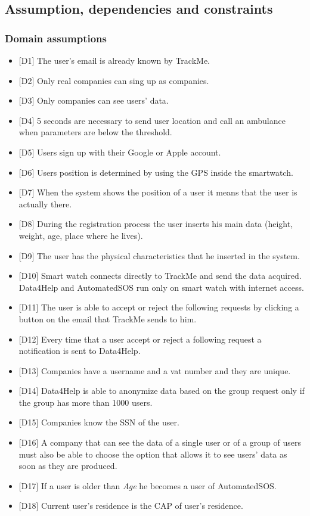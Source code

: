 \documentclass{article}
\begin{document}
\subsection{Assumption, dependencies and constraints}
\subsubsection{Domain assumptions}
\begin{itemize}
	\item {[D1]} The user's email is already known by TrackMe.
	\item {[D2]} Only real companies can sing up as companies.
	\item {[D3]} Only companies can see users' data.
	\item {[D4]} 5 seconds are necessary to send user location and call an ambulance when parameters are below the threshold.
	\item {[D5]} Users sign up with their Google or Apple account.
	\item {[D6]} Users position is determined by using the GPS inside the smartwatch.
	\item {[D7]} When the system shows the position of a user it means that the user is
actually there.
	\item {[D8]} During the registration process the user inserts his main data (height, weight, age, place where he lives).
	\item {[D9]} The user has the physical characteristics that he inserted in the system.
	\item {[D10]} Smart watch connects directly to TrackMe and send the data acquired. Data4Help and AutomatedSOS run only on smart watch with internet access.
	\item {[D11]} The user is able to accept or reject the following requests by clicking a button on the email that TrackMe sends to him.
	\item {[D12]} Every time that a user accept or reject a following request a notification is sent to Data4Help.
	\item {[D13]} Companies have a username and a vat number and they are unique.
	\item {[D14]} Data4Help is able to anonymize data based on the group request only if the group has more than 1000 users.
	\item {[D15]} Companies know the SSN of the user. 
	\item {[D16]} A company that can see the data of a single user or of a group of users must also be able to choose the option that allows it to see users' data as soon as they are produced.
	\item {[D17]} If a user is older than \emph{Age} he becomes a user of AutomatedSOS. 
	\item {[D18]} Current user's residence is the CAP of user's residence. 
\end{itemize}\newpage
\end{document}

